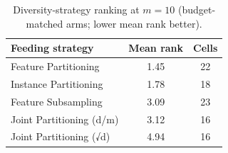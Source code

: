 \begin{table}[ht]
\centering\small
\begin{tabular}{lcc}
\toprule
Feeding strategy & Mean rank & Cells \\
\midrule
Feature Partitioning & 1.45 & 22 \\
Instance Partitioning & 1.78 & 18 \\
Feature Subsampling & 3.09 & 23 \\
Joint Partitioning (d/m) & 3.12 & 16 \\
Joint Partitioning (√d) & 4.94 & 16 \\
\bottomrule
\end{tabular}
\caption{Diversity-strategy ranking at $m=10$ (budget-matched arms; lower mean rank better).}
\label{tab:feeding_ranking}
\end{table}
